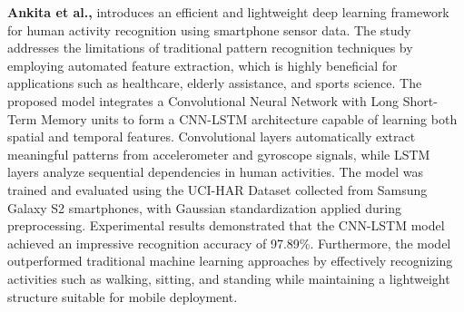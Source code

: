 \textbf{Ankita et al.,} introduces an efficient and lightweight deep learning framework for human activity recognition using smartphone sensor data. The study addresses the limitations of traditional pattern recognition techniques by employing automated feature extraction, which is highly beneficial for applications such as healthcare, elderly assistance, and sports science. The proposed model integrates a Convolutional Neural Network with Long Short-Term Memory units to form a CNN-LSTM architecture capable of learning both spatial and temporal features. Convolutional layers automatically extract meaningful patterns from accelerometer and gyroscope signals, while LSTM layers analyze sequential dependencies in human activities. The model was trained and evaluated using the UCI-HAR Dataset collected from Samsung Galaxy S2 smartphones, with Gaussian standardization applied during preprocessing. Experimental results demonstrated that the CNN-LSTM model achieved an impressive recognition accuracy of 97.89\%. Furthermore, the model outperformed traditional machine learning approaches by effectively recognizing activities such as walking, sitting, and standing while maintaining a lightweight structure suitable for mobile deployment. \textbf{\cite{supplementary_paper_10}}

